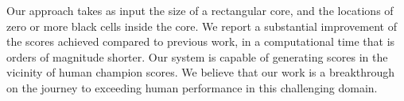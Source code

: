 
Our approach takes as input the size of a rectangular core,
and the locations of zero or more black cells inside the core.
We report a substantial improvement of the scores achieved compared
to previous work, in a computational time that is orders of magnitude shorter.
Our system is capable of generating scores in the vicinity of human champion scores.
We believe that our work is a breakthrough on the journey to exceeding
human performance in this challenging domain.


